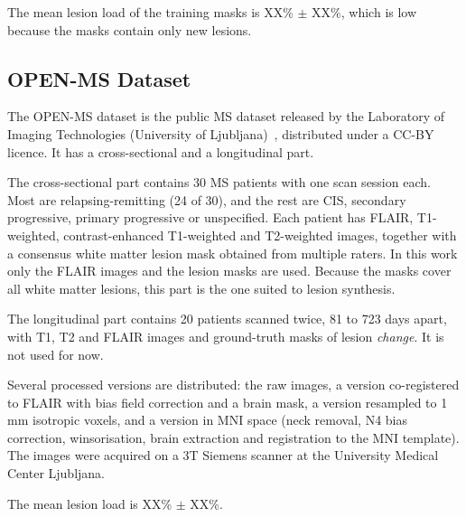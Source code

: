 The mean lesion load of the training masks is XX\% $\pm$ XX\%, which is low because the masks
contain only new lesions.

\subsection{OPEN-MS Dataset}

The OPEN-MS dataset is the public MS dataset released by the Laboratory of Imaging Technologies
(University of Ljubljana)~\cite{lesjak2017,lesjak2016}, distributed under a CC-BY licence. It has a
cross-sectional and a longitudinal part.

The cross-sectional part contains 30 MS patients with one scan session each. Most are
relapsing-remitting (24 of 30), and the rest are CIS, secondary progressive, primary progressive
or unspecified. Each patient has FLAIR, T1-weighted, contrast-enhanced T1-weighted and
T2-weighted images, together with a consensus white matter lesion mask obtained from multiple
raters. In this work only the FLAIR images and the lesion masks are used. Because the masks cover
all white matter lesions, this part is the one suited to lesion synthesis.

The longitudinal part contains 20 patients scanned twice, 81 to 723 days apart, with T1, T2 and
FLAIR images and ground-truth masks of lesion \emph{change}. It is not used for now.

Several processed versions are distributed: the raw images, a version co-registered to FLAIR with
bias field correction and a brain mask, a version resampled to 1\,mm isotropic voxels, and a
version in MNI space (neck removal, N4 bias correction, winsorisation, brain extraction and
registration to the MNI template). The images were acquired on a 3T Siemens scanner at the
University Medical Center Ljubljana.

The mean lesion load is XX\% $\pm$ XX\%.
